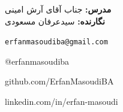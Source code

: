 \documentclass[12pt, a4paper]{article}
\begin{document}
\begin{titlepage}
\begin{center}
    \vspace{1.5cm}
    \begin{minipage}{0.6\textwidth}
        \centering
        \large
        \faUser\ \textbf{مدرس:} جناب آقای آرش امینی \\[0.4cm]
        \faUserGraduate\ \textbf{نگارنده:} سیدعرفان مسعودی
    \end{minipage}
\end{center}

\vfill

\begin{tcolorbox}[
    enhanced,
    colback=lightbg,
    colframe=rulegray,
    arc=3mm,
    boxrule=0.5pt,
    left=10pt, right=10pt, top=12pt, bottom=12pt
]
    \centering
    \small
    \begin{minipage}{0.46\textwidth}
        \centering \faEnvelope\ \texttt{erfanmasoudiba@gmail.com}
    \end{minipage}%
    \begin{minipage}{0.46\textwidth}
        \centering \faTelegram\ @erfanmasoudiba
    \end{minipage}

    \vspace{0.35cm}

    \begin{minipage}{0.46\textwidth}
        \centering \faGithub\ github.com/ErfanMasoudiBA
    \end{minipage}%
    \begin{minipage}{0.46\textwidth}
        \centering \faLinkedin\ linkedin.com/in/erfan-masoudi
    \end{minipage}
\end{tcolorbox}

\vspace{0.8cm}

\end{titlepage}
\restoregeometry

\newpage
\tableofcontents
\newpage

\setcounter{page}{1}

 
\clearpage
 
\clearpage
 
\clearpage
 
\clearpage
\end{document}
